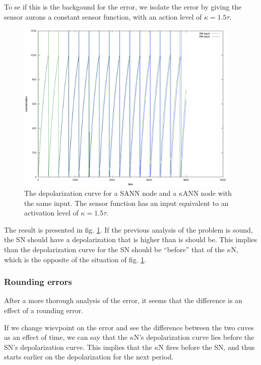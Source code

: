 To se if this is the backgound for the error, we isolate the error by giving the sensor aurons a constant sensor function, with an action level of $\kappa = 1.5 \tau$.
\begin{figure}[hbtp!]
	\label{figComparisonBetweenSsensorAndKsensorDepolCurveCONStActivityLevel}
	\centering
		\includegraphics[width=0.95\textwidth]{eps_comparison_between_KN_and_SN_ConstKappa.eps}
	\caption{The depolarization curve for a SANN node and a $\kappa$ANN node with the same input. The sensor function has an input equivalent to an activation level of $\kappa = 1.5 \tau$.}
\end{figure}

The result is presented in fig. \ref{figComparisonBetweenSsensorAndKsensorDepolCurveCONStActivityLevel}.%
If the previous analysis of the problem is sound, the SN should have a depolarization that is higher than is should be.
This implies than the depolarization curve for the SN should be ``before'' that of the $\kappa$N, which is the opposite of the situation of fig. \ref{figComparisonBetweenSsensorAndKsensorDepolCurveCONStActivityLevel}.

\subsubsection{Rounding errors}
After a more thorough analysis of the error, it seems that the difference is an effect of a rounding error.

If we change wievpoint on the error and see the difference between the two cuves as an effect of time, we can say that the $\kappa$N's depolarization curve lies before the SN's depolarization curve.
This implies that the $\kappa$N fires before the SN, and thus starts earlier on the depolarization for the next period.

